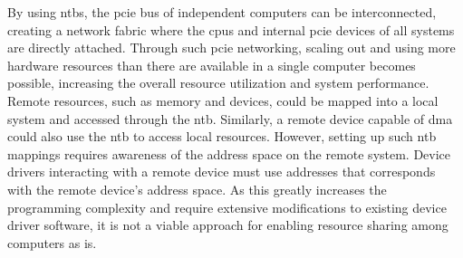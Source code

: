 %
%
%
%

%

By using \glspl{ntb}, the \gls{pcie} bus of independent computers can be interconnected, creating a network fabric where the \glspl{cpu} and internal \gls{pcie} devices of all systems are directly attached.
%
Through such \gls{pcie} networking, scaling out and using more hardware resources than there are available in a single computer becomes possible, increasing the overall resource utilization and system performance. 
%
Remote resources, such as memory and devices, could be mapped into a local system and accessed through the \gls{ntb}. 
%
Similarly, a remote device capable of \gls{dma} could also use the \gls{ntb} to access local resources. 
%
However, setting up such \gls{ntb} mappings requires awareness of the address space on the remote system.
%
Device drivers interacting with a remote device must use addresses that corresponds with the remote device's address space.
%
As this greatly increases the programming complexity and require extensive modifications to existing device driver software, it is not a viable approach for enabling resource sharing among computers  as is.



